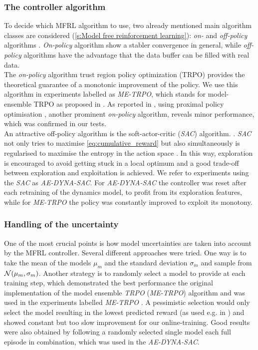 \documentclass[
reprint,
amsmath,amssymb,amsfonts,clevref,
aps,
prstab,
]{revtex4-2}
\begin{document}
\subsubsection{The controller algorithm}
To decide which MFRL algorithm to use, two already mentioned main algorithm classes are considered  (\cref{s:Model free reinforcement learning}): \emph{on-} and  \emph{off-policy} algorithms \cite{Sutton2018}. \emph{On-policy} algorithm show a stabler convergence in general, while \emph{off-policy} algorithms have the advantage that the data buffer can be filled with real data.\\
The \emph{on-policy} algorithm trust region policy optimization (TRPO) \cite{Schulman2015} provides the theoretical guarantee of a monotonic improvement of the policy. We use this algorithm in experiments labelled as \emph{ME-TRPO}, which stands for model-ensemble TRPO as proposed in \cite{Kurutach2018}. As reported in \cite{Kurutach2018}, using proximal policy optimisation \cite{Schulman2017}, another prominent \emph{on-policy} algorithm, reveals minor performance, which was confirmed in our tests. \\
An attractive off-policy algorithm is the soft-actor-critic (\emph{SAC}) algorithm. \cite{fujimoto2018addressing,Hill2018}. \emph{SAC} not only tries to maximise \cref{eq:cumulative_reward} but also simultaneously is regularised to maximise the entropy in the action space \cite{Haarnoja2018a}. In this way, exploration is encouraged to avoid getting stuck in a local optimum and a good trade-off between exploration and exploitation is achieved. We refer to experiments using the \emph{SAC} as \emph{AE-DYNA-SAC}. 
For \emph{AE-DYNA-SAC} the controller was reset after each retraining of the dynamics model, to profit from its exploration features, while for \emph{ME-TRPO} the policy was constantly improved to exploit its monotony.
\subsubsection{Handling of the uncertainty}
One of the most crucial points is how model uncertainties are taken into account by the MFRL controller. Several different approaches were tried. One way is to take the mean of the models $\mu_m$ and the standard deviation $\sigma_m$ and sample from $\mathcal{N}(\mu_m,\sigma_m)$. Another strategy is to randomly select a model to provide at each training step, which demonstrated the best performance the original implementation of the model ensemble \emph{TRPO} (\emph{ME-TRPO}) algorithm and was used in the experiments labelled \emph{ME-TRPO} \cite{Kurutach2018}. A pessimistic selection would only select the model resulting in the lowest predicted reward (as used e.g. in \cite{kidambi2020morel}) and showed constant but too slow improvement for our online-training.
Good results were also obtained by following a randomly selected single model each full episode in combination, which was used in the \emph{AE-DYNA-SAC}. 
\end{document}
